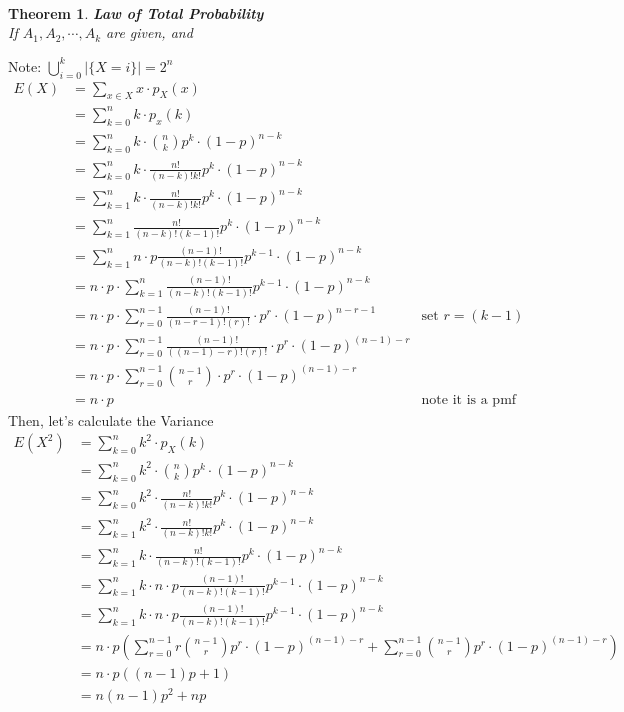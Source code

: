 \documentclass[11pt,oneside]{book}
\theoremstyle{break}
\theoremstyle{break}
\newtheorem{thm}{Theorem}[section]
\newcommand{\note}{\color{red}Note: \color{black}}
\begin{document}
\hfill\\
\begin{thm}
\textbf{Law of Total Probability}\\
If $A_1,A_2,\cdots,A_k$ are given, and 
\end{thm}
\note $\bigcup_{i=0}^{k}|\{X=i\}|=2^n$\\
\begin{align*}
E(X)&=\sum_{x\in X}x\cdot p_X(x)\\
&=\sum_{k=0}^{n}k\cdot p_x(k)\\
&=\sum_{k=0}^{n}k\cdot \binom nk p^k\cdot (1-p)^{n-k}\\
&=\sum_{k=0}^{n}k\cdot \frac{n!}{(n-k)!k!} p^k\cdot (1-p)^{n-k}\\
&=\sum_{k=1}^{n}k\cdot \frac{n!}{(n-k)!k!} p^k\cdot (1-p)^{n-k}\\
&=\sum_{k=1}^{n}\frac{n!}{(n-k)!(k-1)!} p^k\cdot (1-p)^{n-k}\\
&=\sum_{k=1}^{n}n\cdot p \frac{(n-1)!}{(n-k)!(k-1)!} p^{k-1}\cdot (1-p)^{n-k}\\
&=n\cdot p \cdot \sum_{k=1}^{n}\frac{(n-1)!}{(n-k)!(k-1)!} p^{k-1}\cdot (1-p)^{n-k}\\
&=n\cdot p \cdot \sum_{r=0}^{n-1}\frac{(n-1)!}{(n-r-1)!(r)!} \cdot p^{r}\cdot (1-p)^{n-r-1} &\text{set }r=(k-1)\\
&=n\cdot p \cdot \sum_{r=0}^{n-1}\frac{(n-1)!}{((n-1)-r)!(r)!} \cdot p^{r}\cdot (1-p)^{(n-1)-r} \\
&=n\cdot p \cdot \sum_{r=0}^{n-1}\binom{n-1}{r}  \cdot p^{r}\cdot (1-p)^{(n-1)-r} \\
&=n\cdot p &\text{note it is a pmf for binom((n-1), p), so the sum is 1}
\end{align*}
Then, let's calculate the Variance \begin{align*}
E(X^2)&=\sum_{k=0}^n k^2\cdot p_X(k)\\
&=\sum_{k=0}^{n}k^2\cdot \binom nk p^k\cdot (1-p)^{n-k}\\
&=\sum_{k=0}^{n}k^2 \cdot \frac{n!}{(n-k)!k!} p^k\cdot (1-p)^{n-k}\\
&=\sum_{k=1}^{n}k^2\cdot \frac{n!}{(n-k)!k!} p^k\cdot (1-p)^{n-k}\\
&=\sum_{k=1}^{n}k\cdot \frac{n!}{(n-k)!(k-1)!} p^k\cdot (1-p)^{n-k}\\
&=\sum_{k=1}^{n}k\cdot n \cdot p \frac{(n-1)!}{(n-k)!(k-1)!} p^{k-1}\cdot (1-p)^{n-k}\\
&=\sum_{k=1}^{n}k\cdot n \cdot p \frac{(n-1)!}{(n-k)!(k-1)!} p^{k-1}\cdot (1-p)^{n-k}\\
&=n\cdot p \left( \sum_{r=0}^{n-1}r\binom{n-1}{r}p^r\cdot (1-p)^{(n-1)-r}+\sum_{r=0}^{n-1}\binom{n-1}{r}p^r\cdot (1-p)^{(n-1)-r} \right)\\
&=n\cdot p((n-1)p+1)\\
&=n(n-1)p^2+np
\end{align*}
\end{document}

